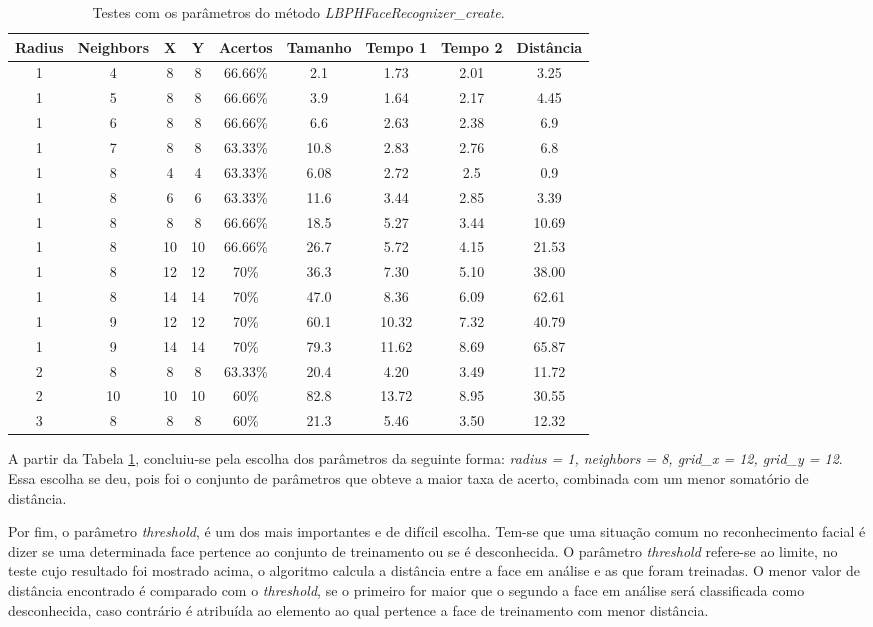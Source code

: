 \begin{table}[ht]
\centering
\caption{Testes com os parâmetros do método \textit{LBPHFaceRecognizer\_create}.}
\vspace{0.5cm}
\begin{tabular}{ccccccccc}
 
Radius & Neighbors & X & Y & Acertos & Tamanho & Tempo 1 & Tempo 2 & Distância \\
\hline
1 & 4 &8 &8 &66.66\% & 2.1 & 1.73 &2.01 & 3.25 \\
1 & 5 &8 &8 &66.66\% & 3.9 & 1.64 &2.17 & 4.45 \\
1 & 6 &8 &8 &66.66\% & 6.6 & 2.63 &2.38 & 6.9 \\
1 & 7 &8 &8 &63.33\% & 10.8 & 2.83 &2.76 & 6.8 \\
1 & 8 &4 &4 &63.33\% & 6.08 & 2.72 &2.5 & 0.9 \\
1 & 8 &6 &6 &63.33\% & 11.6 & 3.44 &2.85 & 3.39 \\
1 & 8 &8 &8 &66.66\% & 18.5 & 5.27 &3.44 & 10.69 \\
1 & 8 &10 &10 &66.66\% & 26.7 & 5.72 &4.15 & 21.53 \\
1 & 8 &12 &12 &70\% & 36.3 & 7.30 &5.10 & 38.00 \\
1 & 8 &14 &14 &70\% & 47.0 & 8.36 &6.09 & 62.61 \\
1 & 9 &12 &12 &70\% & 60.1 & 10.32 &7.32 & 40.79 \\
1 & 9 &14 &14 &70\% & 79.3 & 11.62 &8.69 & 65.87 \\
2 & 8 &8 &8 &63.33\% & 20.4 & 4.20 &3.49 & 11.72 \\
2 & 10 &10 &10 &60\% & 82.8 & 13.72 &8.95 & 30.55 \\
3 & 8 &8 &8 &60\% & 21.3 & 5.46 &3.50 & 12.32 \\

\end{tabular}
\label{tab:tabela1}
\end{table}

A partir da Tabela \ref{tab:tabela1}, concluiu-se pela escolha dos parâmetros da seguinte forma: \textit{radius = 1, neighbors = 8, grid\_x = 12, grid\_y = 12}. Essa escolha se deu, pois foi o conjunto de parâmetros que obteve a maior taxa de acerto, combinada com um menor somatório de distância.

Por fim, o parâmetro \textit{threshold}, é um dos mais importantes e de difícil escolha. Tem-se que uma situação comum no reconhecimento facial é dizer se uma determinada face pertence ao conjunto de treinamento ou se é desconhecida. O parâmetro \textit{threshold}  refere-se ao limite, no teste cujo resultado foi mostrado acima, o algoritmo calcula a distância entre a face em análise e as que foram treinadas. O menor valor de distância encontrado é comparado com o \textit{threshold}, se o primeiro for maior que o segundo a face em análise será classificada como desconhecida, caso contrário é atribuída ao elemento ao qual pertence a face de treinamento com menor distância.

